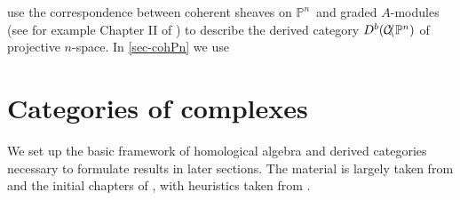 \documentclass[a4paper]{article}
\theoremstyle{definition}
\theoremstyle{remark}
\newcommand{\Pn}{\ensuremath{{\mathbb{P}^n}}}
\DeclareMathOperator{\coh}{\mathcal{C\kern -2pt o\kern -2pt h\kern -1pt}}
\begin{document}
 use the correspondence between coherent
sheaves on \Pn\ and graded \(A\)-modules (see for example Chapter II of
) to describe the derived category
\(D^b(\coh\Pn)\) of projective \(n\)-space. In \ref{sec-cohPn} we use


\section{Categories of complexes}\label{sec-trianglecat}

We set up the basic framework of homological algebra and derived
categories necessary to formulate results in later sections. The material is
largely taken from  and the initial
chapters of , with heuristics taken
from .
\end{document}
